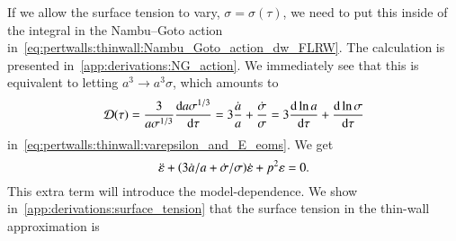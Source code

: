     If we allow the surface tension to vary, $\sigma=\sigma(\tau)$, %
    we need to put this inside of the integral in the Nambu--Goto action in~\cref{eq:pertwalls:thinwall:Nambu_Goto_action_dw_FLRW}. The calculation is presented in~\cref{app:derivations:NG_action}. We immediately see that this is equivalent to letting $a^3\to a^3 \sigma$, which amounts to
    \begin{equation}
        \mathcal{D}(\tau) = \frac{3}{a\sigma^{1/3}} \dv{a\sigma^{1/3}}{\tau} =  3\frac{\dot{a}}{a} +  \frac{\dot{\sigma}}{\sigma} = 3\dv{\ln{a}}{\tau} + \dv{\ln{\sigma}}{\tau}
    \end{equation}
    in~\cref{eq:pertwalls:thinwall:varepsilon_and_E_eoms}. We get
    \begin{equation}
        \ddot{\varepsilon} + {\left( 3\dot{a}/a + \dot{\sigma}/\sigma \right)}\dot{\varepsilon} +p^2 \varepsilon = 0.
    \end{equation}
    This extra term will introduce the model-dependence. We show in~\cref{app:derivations:surface_tension} that the surface tension in the thin-wall approximation is
